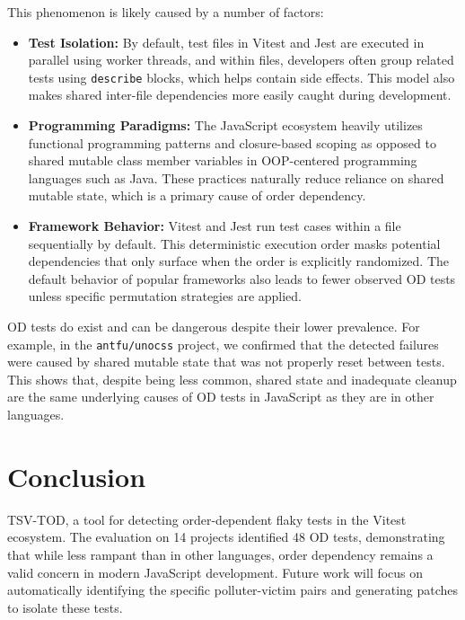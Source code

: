 \documentclass[10pt, conference]{IEEEtran}
\begin{document}
This phenomenon is likely caused by a number of factors:
\begin{itemize}
  \item \textbf{Test Isolation:} By default, test files in Vitest and Jest are executed in parallel using worker threads, and within files, developers often group related tests using \texttt{describe} blocks, which helps contain side effects. This model also makes shared inter-file dependencies more easily caught during development.
  \item \textbf{Programming Paradigms:} The JavaScript ecosystem heavily utilizes functional programming patterns and closure-based scoping as opposed to shared mutable class member variables in OOP-centered programming languages such as Java. These practices naturally reduce reliance on shared mutable state, which is a primary cause of order dependency.
  \item \textbf{Framework Behavior:} Vitest and Jest run test cases within a file sequentially by default. This deterministic execution order masks potential dependencies that only surface when the order is explicitly randomized. The default behavior of popular frameworks also leads to fewer observed OD tests unless specific permutation strategies are applied.
\end{itemize}

OD tests do exist and can be dangerous despite their lower prevalence. For example, in the \texttt{antfu/unocss} project, we confirmed that the detected failures were caused by shared mutable state that was not properly reset between tests. This shows that, despite being less common, shared state and inadequate cleanup are the same underlying causes of OD tests in JavaScript as they are in other languages.

\section{Conclusion}
TSV-TOD, a tool for detecting order-dependent flaky tests in the Vitest ecosystem. The evaluation on 14 projects identified 48 OD tests, demonstrating that while less rampant than in other languages, order dependency remains a valid concern in modern JavaScript development. Future work will focus on automatically identifying the specific polluter-victim pairs and generating patches to isolate these tests.
\end{document}

